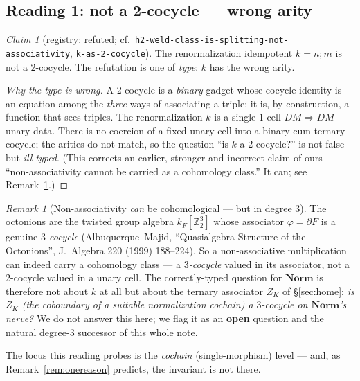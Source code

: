 \documentclass[11pt]{amsart}
\theoremstyle{plain}
\theoremstyle{definition}
\theoremstyle{remark}
\newtheorem{remark}[theorem]{Remark}
\newtheorem{claim}[theorem]{Claim}
\newcommand{\Norm}{\mathbf{Norm}}
\newcommand{\comp}{\mathbin{;}}
\begin{document}
\subsection{Reading 1: not a 2-cocycle --- wrong arity}
\label{sec:cocycle}

\begin{claim}[registry: refuted; cf.\ \texttt{h2-weld-class-is-splitting-not-associativity},
\texttt{k-as-2-cocycle}]
\label{clm:cocycle}
The renormalization idempotent $k=n\comp m$ is not a $2$-cocycle. The refutation is one of
\emph{type}: $k$ has the wrong arity.
\end{claim}

\begin{proof}[Why the type is wrong]
A $2$-cocycle is a \emph{binary} gadget whose cocycle identity is an equation among the \emph{three}
ways of associating a triple; it is, by construction, a function that sees triples. The
renormalization $k$ is a single $1$-cell $DM\Rightarrow DM$ --- unary data. There is no coercion of a
fixed unary cell into a binary-cum-ternary cocycle; the arities do not match, so the question ``is
$k$ a $2$-cocycle?'' is not false but \emph{ill-typed}. (This corrects an earlier, stronger and
incorrect claim of ours --- ``non-associativity cannot be carried as a cohomology class.'' It can;
see Remark~\ref{rem:degree3}.)
\end{proof}

\begin{remark}[Non-associativity \emph{can} be cohomological --- but in degree 3]
\label{rem:degree3}
The octonions are the twisted group algebra $k_{F}[\mathbb{Z}_{2}^{3}]$ whose associator
$\varphi=\partial F$ is a genuine \emph{$3$-cocycle} (Albuquerque--Majid, ``Quasialgebra Structure of
the Octonions'', J.\ Algebra 220 (1999) 188--224). So a non-associative multiplication can indeed
carry a cohomology class --- a \emph{$3$-cocycle} valued in its associator, not a $2$-cocycle valued
in a unary cell. The correctly-typed question for $\Norm$ is therefore not about $k$ at all but about
the ternary associator $Z_{K}$ of \S\ref{sec:home}: \emph{is $Z_{K}$ (the coboundary of a suitable
normalization cochain) a $3$-cocycle on $\Norm$'s nerve?} We do not answer this here; we flag it as
an \textbf{open} question and the natural degree-$3$ successor of this whole note.
\end{remark}

The locus this reading probes is the \emph{cochain} (single-morphism) level --- and, as
Remark~\ref{rem:onereason} predicts, the invariant is not there.
\end{document}
